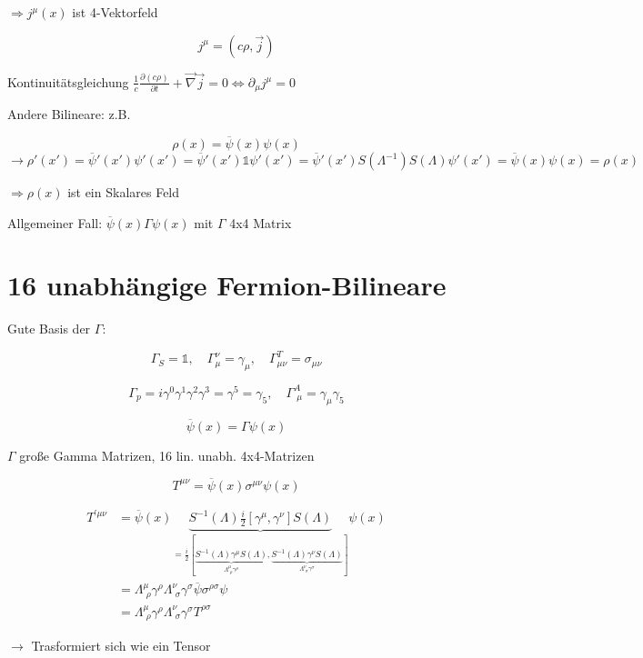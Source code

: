 \(\Rightarrow j^\mu(x)\) ist 4-Vektorfeld

\[j^\mu = (c\rho,\vec j)\]

Kontinuitätsgleichung \(\frac{1}{c}\frac{\partial(c \rho) }{\partial t} + \vec\nabla\vec j = 0 \Leftrightarrow  \partial_\mu j^\mu = 0 \)

Andere Bilineare: z.B.

\[\rho(x) = \overline \psi(x)\psi(x)\]
\[ \rightarrow \rho'(x')=\overline \psi'(x')\psi'(x') = \overline \psi'(x')\mathbb 1 \psi'(x') = \overline \psi'(x') S(\Lambda^{-1})S(\Lambda) \psi'(x') = \overline \psi(x)\psi(x) = \rho(x) \]

\(\Rightarrow \rho(x)\) ist ein Skalares Feld

Allgemeiner Fall: \( \overline \psi(x)\Gamma \psi(x)  \) mit \(\Gamma\) 4x4 Matrix

\section{16 unabhängige Fermion-Bilineare}

Gute Basis der \(\Gamma\):

\[\Gamma_S = \mathbb 1, \quad \Gamma^\nu_\mu =\gamma_\mu, \quad \Gamma^T_{\mu\nu} = \sigma_{\mu\nu}\]

\[\Gamma_p = i\gamma^0\gamma^1\gamma^2\gamma^3 = \gamma^5 = \gamma_5, \quad \Gamma^A_{\,\,\mu} = \gamma_\mu\gamma_5 \]




\[\overline \psi(x) = \Gamma\psi(x)\]

\(\Gamma\) große Gamma Matrizen, 16 lin. unabh. 4x4-Matrizen

\[T^{\mu\nu}=\overline \psi(x)\sigma^{\mu\nu} \psi(x) \]

\begin{align}
T^{'\mu\nu}&=\overline \psi(x)\underbrace{  S^{-1}(\Lambda)\frac{i}{2}[\gamma^\mu,\gamma^\nu]S(\Lambda)}_{  = \frac{i}{2}[\underbrace{S^{-1}(\Lambda)\gamma^\mu S(\Lambda)}_{\Lambda^\mu_{\,\,\rho}\gamma^\rho},\underbrace{S^{-1}(\Lambda)\gamma^\nu S(\Lambda)}_{\Lambda^\nu_{\,\,\sigma}\gamma^\sigma} ]  } \psi(x)\\
&= \Lambda^\mu_{\,\,\rho}\gamma^\rho \Lambda^\nu_{\,\,\sigma}\gamma^\sigma\overline \psi \sigma^{\rho\sigma}\psi\\
&= \Lambda^\mu_{\,\,\rho}\gamma^\rho \Lambda^\nu_{\,\,\sigma}\gamma^\sigma T^{\rho\sigma}
\end{align}

\(\rightarrow \) Trasformiert sich wie ein Tensor

